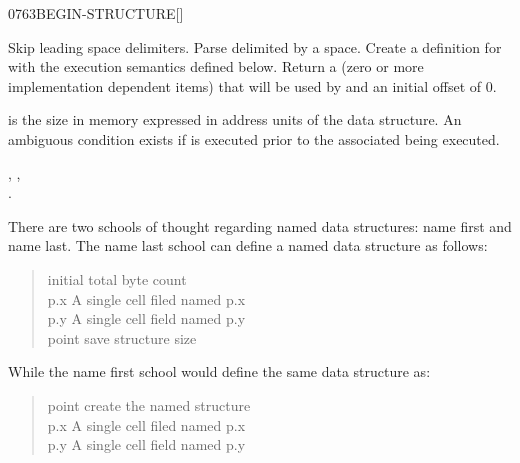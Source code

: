 \begin{worddef}{0763}{BEGIN-STRUCTURE}[]%
\item {}

	Skip leading space delimiters. Parse  delimited
	by a space. Create a definition for  with the
	execution semantics defined below.  Return a 
	(zero or more implementation dependent items) that will be
	used by  and an initial offset of 0.

\execute[name]

	 is the size in memory expressed in address units of
	the data structure.  An ambiguous condition exists if
	 is executed prior to the associated
	 being executed.

\see {},
	, \\
	.


	\begin{rationale} %
		There are two schools of thought regarding named data
		structures: name first and name last.  The name last
		school can define a named data structure as follows:

		\begin{quote} \tab[11.5]  initial total byte count \\
		   p.x	\tab {} A single cell filed named p.x \\
		   p.y   \tab {} A single cell field named p.y \\
		 point \tab[3.8]  save structure size
		\end{quote}

		While the name first school would define the same data
		structure as:

		\begin{quote}\ttfamily
		 point \tab[-.3]  create the named structure \\
		   p.x	\tab {} A single cell filed named p.x \\
		   p.y   \tab {} A single cell field named p.y \\
		\end{quote}


\end{rationale}
\end{worddef}
